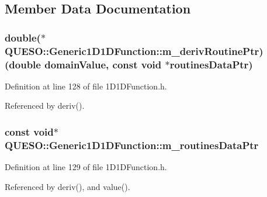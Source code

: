 \subsection{Member Data Documentation}
\hypertarget{class_q_u_e_s_o_1_1_generic1_d1_d_function_ac87c844759657a4a9537ea2bfe2132db}{
\subsubsection[{m\-\_\-deriv\-Routine\-Ptr}]{\setlength{\rightskip}{0pt plus 5cm}double($\ast$ Q\-U\-E\-S\-O\-::\-Generic1\-D1\-D\-Function\-::m\-\_\-deriv\-Routine\-Ptr)(double domain\-Value, const void $\ast$routines\-Data\-Ptr)\hspace{0.3cm}{\ttfamily [protected]}}}\label{class_q_u_e_s_o_1_1_generic1_d1_d_function_ac87c844759657a4a9537ea2bfe2132db}


Definition at line 128 of file 1\-D1\-D\-Function.\-h.



Referenced by deriv().

\hypertarget{class_q_u_e_s_o_1_1_generic1_d1_d_function_a57e54587cb5511615131144485513ab6}{
\subsubsection[{m\-\_\-routines\-Data\-Ptr}]{\setlength{\rightskip}{0pt plus 5cm}const void$\ast$ Q\-U\-E\-S\-O\-::\-Generic1\-D1\-D\-Function\-::m\-\_\-routines\-Data\-Ptr\hspace{0.3cm}{\ttfamily [protected]}}}\label{class_q_u_e_s_o_1_1_generic1_d1_d_function_a57e54587cb5511615131144485513ab6}


Definition at line 129 of file 1\-D1\-D\-Function.\-h.



Referenced by deriv(), and value().

